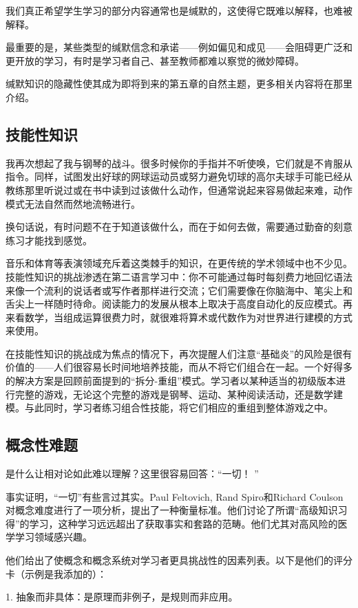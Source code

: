 我们真正希望学生学习的部分内容通常也是缄默的，这使得它既难以解释，也难被解释。

最重要的是，某些类型的缄默信念和承诺——例如偏见和成见——会阻碍更广泛和更开放的学习，有时是学习者自己、甚至教师都难以察觉的微妙障碍。

缄默知识的隐藏性使其成为即将到来的第五章的自然主题，更多相关内容将在那里介绍。

\subsection*{技能性知识}

我再次想起了我与钢琴的战斗。很多时候你的手指并不听使唤，它们就是不肯服从指令。同样，试图发出好球的网球运动员或努力避免切球的高尔夫球手可能已经从教练那里听说过或在书中读到过该做什么动作，但通常说起来容易做起来难，动作模式无法自然而然地流畅进行。

换句话说，有时问题不在于知道该做什么，而在于如何去做，需要通过勤奋的刻意练习才能找到感觉。

音乐和体育等表演领域充斥着这类棘手的知识，在更传统的学术领域中也不少见。技能性知识的挑战渗透在第二语言学习中：你不可能通过每时每刻费力地回忆语法来像一个流利的说话者或写作者那样进行交流；它们需要像在你脑海中、笔尖上和舌尖上一样随时待命。阅读能力的发展从根本上取决于高度自动化的反应模式。再来看数学，当组成运算很费力时，就很难将算术或代数作为对世界进行建模的方式来使用。

在技能性知识的挑战成为焦点的情况下，再次提醒人们注意“基础炎”的风险是很有价值的——人们很容易长时间地培养技能，而从不将它们组合在一起。一个好得多的解决方案是回顾前面提到的“拆分-重组”模式。学习者以某种适当的初级版本进行完整的游戏，无论这个完整的游戏是钢琴、运动、某种阅读活动，还是数学建模。与此同时，学习者练习组合性技能，将它们相应的重组到整体游戏之中。

\subsection*{概念性难题}

是什么让相对论如此难以理解？这里很容易回答：“一切！ ”

事实证明，“一切”有些言过其实。Paul Feltovich, Rand Spiro和Richard Coulson对概念难度进行了一项分析，提出了一种衡量标准。他们讨论了所谓“高级知识习得”的学习，这种学习远远超出了获取事实和套路的范畴。他们尤其对高风险的医学学习领域感兴趣。

他们给出了使概念和概念系统对学习者更具挑战性的因素列表。以下是他们的评分卡（示例是我添加的）：

1.	抽象而非具体：是原理而非例子，是规则而非应用。

